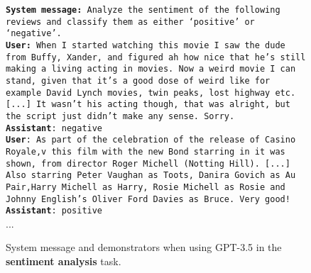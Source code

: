 \documentclass[11pt]{article}
\begin{document}
\begin{figure}[!htb]
\scriptsize
\begin{minipage}{\columnwidth}
\small\texttt{{\textbf{System message:} Analyze the sentiment of the following reviews and classify them as either `positive' or `negative'.
}}\\

{\small\texttt{\textbf{User:} When I started watching this movie I saw the dude 
from Buffy, Xander, and figured ah how nice that he's still making a living acting in movies. Now a weird movie I can stand, given that it's a good dose of weird like for example David Lynch movies, twin peaks, lost highway etc.  [...] It wasn't his acting though, that was alright, but the script just didn't make any sense. Sorry.}}\\
{\small\texttt{\textbf{Assistant}: negative}}\\

{\small\texttt{\textbf{User}: As part of the celebration of the release of Casino Royale,v this film with the new Bond starring in it was shown, from director Roger Michell (Notting Hill). [...] Also starring Peter Vaughan as Toots, Danira Govich as Au Pair,Harry Michell as Harry, Rosie Michell as Rosie and Johnny English's Oliver Ford Davies as Bruce. 
Very good!}}\\
{\small\texttt{\textbf{Assistant}: positive}}\\
...
\end{minipage}
\vspace*{-2mm}
\caption{System message and demonstrators when using GPT-3.5 in the \textbf{sentiment analysis} task.}
\vspace*{-6mm}
\label{fig:sentiment_prompt}
\end{figure}
\end{document}

